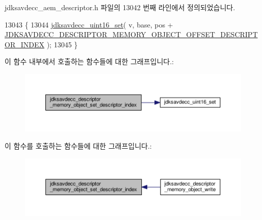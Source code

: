 jdksavdecc\+\_\+aem\+\_\+descriptor.\+h 파일의 13042 번째 라인에서 정의되었습니다.


\begin{DoxyCode}
13043 \{
13044     \hyperlink{group__endian_ga14b9eeadc05f94334096c127c955a60b}{jdksavdecc\_uint16\_set}( v, base, pos + 
      \hyperlink{group__descriptor__memory__object_ga87b3c2bc203838d734867aa999b68b88}{JDKSAVDECC\_DESCRIPTOR\_MEMORY\_OBJECT\_OFFSET\_DESCRIPTOR\_INDEX}
       );
13045 \}
\end{DoxyCode}


이 함수 내부에서 호출하는 함수들에 대한 그래프입니다.\+:
\nopagebreak
\begin{figure}[H]
\begin{center}
\leavevmode
\includegraphics[width=350pt]{group__descriptor__memory__object_ga4e422f16b4b4e84f1063a7d6dfaa958d_cgraph}
\end{center}
\end{figure}




이 함수를 호출하는 함수들에 대한 그래프입니다.\+:
\nopagebreak
\begin{figure}[H]
\begin{center}
\leavevmode
\includegraphics[width=350pt]{group__descriptor__memory__object_ga4e422f16b4b4e84f1063a7d6dfaa958d_icgraph}
\end{center}
\end{figure}


